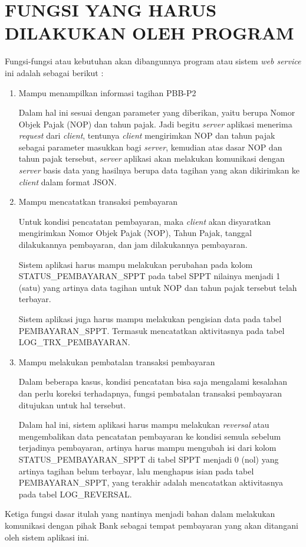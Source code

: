 \chapter{FUNGSI YANG HARUS DILAKUKAN OLEH PROGRAM}

Fungsi-fungsi atau kebutuhan akan dibangunnya program atau sistem \textit{web service} ini adalah sebagai berikut :

\begin{enumerate}[1.]
  \item Mampu menampilkan informasi tagihan PBB-P2
  
  Dalam hal ini sesuai dengan parameter yang diberikan, yaitu berupa Nomor Objek Pajak (NOP) dan tahun pajak. Jadi begitu \textit{server} aplikasi menerima \textit{request} dari \textit{client}, tentunya \textit{client} mengirimkan NOP dan tahun pajak sebagai parameter masukkan bagi \textit{server}, kemudian atas dasar NOP dan tahun pajak tersebut, \textit{server} aplikasi akan melakukan komunikasi dengan \textit{server} basis data yang hasilnya berupa data tagihan yang akan dikirimkan ke \textit{client} dalam format JSON.
  
  \item Mampu mencatatkan transaksi pembayaran
  
  Untuk kondisi pencatatan pembayaran, maka \textit{client} akan disyaratkan mengirimkan Nomor Objek Pajak (NOP), Tahun Pajak, tanggal dilakukannya pembayaran, dan jam dilakukannya pembayaran. 
  
  Sistem aplikasi harus mampu melakukan perubahan pada kolom STATUS\_PEMBAYARAN\_SPPT pada tabel SPPT nilainya menjadi 1 (satu) yang artinya data tagihan untuk NOP dan tahun pajak tersebut telah terbayar.
  
  Sistem aplikasi juga harus mampu melakukan pengisian data pada tabel PEMBAYARAN\_SPPT. Termasuk mencatatkan aktivitasnya pada tabel LOG\_TRX\_PEMBAYARAN.
  
  \item Mampu melakukan pembatalan transaksi pembayaran
  
  Dalam beberapa kasus, kondisi pencatatan bisa saja mengalami kesalahan dan perlu koreksi terhadapnya, fungsi pembatalan transaksi pembayaran ditujukan untuk hal tersebut.
  
  Dalam hal ini, sistem aplikasi harus mampu melakukan \textit{reversal} atau mengembalikan data pencatatan pembayaran ke kondisi semula sebelum terjadinya pembayaran, artinya harus mampu mengubah isi dari kolom STATUS\_PEMBAYARAN\_SPPT di tabel SPPT menjadi 0 (nol) yang artinya tagihan belum terbayar, lalu menghapus isian pada tabel PEMBAYARAN\_SPPT, yang terakhir adalah mencatatkan aktivitasnya pada tabel LOG\_REVERSAL.
\end{enumerate}

Ketiga fungsi dasar itulah yang nantinya menjadi bahan dalam melakukan komunikasi dengan pihak Bank sebagai tempat pembayaran yang akan ditangani oleh sistem aplikasi ini.